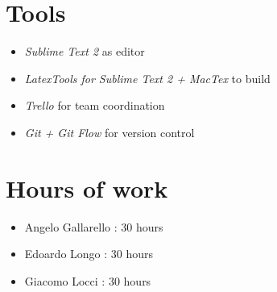 \newpage
\begin{appendices}
\section{Tools}

\begin{itemize}
	\item \emph{Sublime Text 2} as editor
	\item \emph{LatexTools for Sublime Text 2 + MacTex}  to build
	\item \emph{Trello} for team coordination 
	\item \emph{Git + Git Flow} for version control 
\end{itemize}

\section{Hours of work}

\begin{itemize}
	\item Angelo Gallarello : 30 hours
	\item Edoardo Longo : 30 hours
	\item Giacomo Locci : 30 hours
\end{itemize}

\end{appendices}